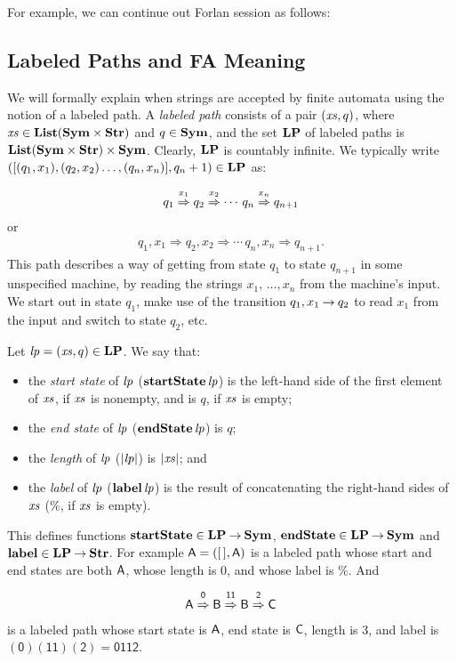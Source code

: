 For example, we can continue out Forlan session as follows:


\subsection{Labeled Paths and FA Meaning}

We will formally explain when strings are accepted by finite automata
%
using the notion of a labeled path.  A \emph{labeled path} consists of
a pair $({\it xs},q)$, where ${\it xs}\in\mathbf{List}(\mathbf{Sym}\times\mathbf{Str})$ and $q\in\mathbf{Sym}$,
and the set $\mathbf{LP}$ of labeled paths is
$\mathbf{List}(\mathbf{Sym}\times\mathbf{Str})\times\mathbf{Sym}$.  Clearly, $\mathbf{LP}$ is countably
infinite.  We typically write
$([(q_1,x_1),(q_2,x_2)\ldots,(q_n,x_n)],q_n+1)\in\mathbf{LP}$ as:
\begin{gather*}
q_1\stackrel{\strut x_1}{\Rightarrow}q_2\stackrel{\strut x_2}{\Rightarrow}\cdots\,q_n\stackrel{\strut x_n}{\Rightarrow}q_{n+1}
\end{gather*}
or
\begin{gather*}
q_1,x_1\Rightarrow q_2,x_2\Rightarrow\cdots\,q_n,x_n\Rightarrow q_{n+1} .
\end{gather*}
This path describes a way of getting from state $q_1$ to state $q_{n+1}$
in some unspecified machine, by reading the strings
$x_1,\,\ldots,x_n$ from the machine's input.  We start out in
state $q_1$, make use of the transition $q_1,x_1\mathbin{\to} q_2$ to read
$x_1$ from the input and switch to state $q_2$, etc.

Let ${\it lp}=({\it xs},q)\in\mathbf{LP}$.
We say that:
\begin{itemize}
\item the \emph{start state} of ${\it lp}$ ($\mathbf{startState}\,{\it lp}$) is
  the left-hand side of the first element of ${\it xs}$, if ${\it xs}$ is nonempty,
  and is $q$, if ${\it xs}$ is empty;

\item the \emph{end state} of ${\it lp}$ ($\mathbf{endState}\,{\it lp}$) is $q$;

\item the \emph{length} of ${\it lp}$ ($|{\it lp}|$) is $|{\it xs}|$; and

\item the \emph{label} of ${\it lp}$ ($\mathbf{label}\,{\it lp}$) is the result of
  concatenating the right-hand sides of ${\it xs}$ ($\%$, if ${\it xs}$ is
  empty).
\end{itemize}
This defines functions $\mathbf{startState}\in\mathbf{LP}\mathbin{\to}\mathbf{Sym}$,
$\mathbf{endState}\in\mathbf{LP}\mathbin{\to}\mathbf{Sym}$ and $\mathbf{label}\in\mathbf{LP}\mathbin{\to}\mathbf{Str}$.
For example $\mathsf{A} = ([\,],\mathsf{A})$
is a labeled path whose start and end states are both $\mathsf{A}$, whose
length is $0$, and whose label is $\%$.  And
\begin{gather*}
\mathsf{A}\stackrel{\strut\mathsf{0}}{\Rightarrow}\mathsf{B}\stackrel{\strut\mathsf{11}}{\Rightarrow}\mathsf{B}\stackrel{\strut\mathsf{2}}{\Rightarrow}\mathsf{C}
\end{gather*}
is a labeled path whose start state is $\mathsf{A}$, end state is $\mathsf{C}$,
length is $3$, and label is $\mathsf{(0)(11)(2)}=\mathsf{0112}$.

